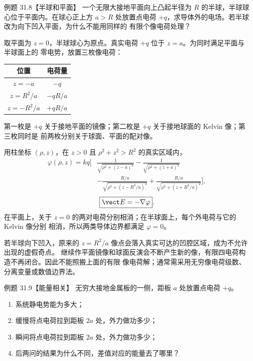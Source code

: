 \Needspace{0.42\textheight}
\begin{origexamplebox}{例题 31.8【半球和平面】}
一个无限大接地平面向上凸起半径为 $R$ 的半球，半球球心位于平面内。在球心正上方
$a>R$ 处放置点电荷 $+q$，求导体外的电场。若半球改为向下凹入平面，为什么不能用同样的
有限个像电荷处理？
\end{origexamplebox}

\begin{xesolution}
取平面为 $z=0$，半球球心为原点。真实电荷 $+q$ 位于 $z=a$。为同时满足平面与半球面上的
零电势，放置三枚像电荷：
\begin{center}
\begin{tabular}{c c}
\toprule
位置 & 电荷量\\
\midrule
$z=-a$ & $-q$\\
$z=R^2/a$ & $-qR/a$\\
$z=-R^2/a$ & $+qR/a$\\
\bottomrule
\end{tabular}
\end{center}
第一枚是 $+q$ 关于接地平面的镜像；第二枚是 $+q$ 关于接地球面的 Kelvin 像；第三枚同时是
前两枚分别关于球面、平面的配对像。

用柱坐标 $(\rho,z)$，在 $z>0$ 且 $\rho^2+z^2>R^2$ 的真实区域内，
\begin{align*}
  \varphi(\rho,z)=kq\bigg[&
  \frac1{\sqrt{\rho^2+(z-a)^2}}
  -\frac1{\sqrt{\rho^2+(z+a)^2}}\\
  &-\frac{R/a}{\sqrt{\rho^2+(z-R^2/a)^2}}
  +\frac{R/a}{\sqrt{\rho^2+(z+R^2/a)^2}}
  \bigg],
\end{align*}
\begin{equation}
  \boxed{\vect E=-\nabla\varphi}.
\end{equation}
在平面上，关于 $z=0$ 的两对电荷分别相消；在半球面上，每个外电荷与它的 Kelvin 像分别
相消，所以两类导体边界都满足 $\varphi=0$。

若半球向下凹入，原来的 $z=R^2/a$ 像点会落入真实可达的凹腔区域，成为不允许出现的虚假奇点。
继续作平面镜像和球面反演会不断产生新的像，有限四电荷构造不再闭合。因此不能照搬上面的有限
像电荷解；通常需采用无穷像电荷级数、分离变量或数值边界法。

\hemisphereImageDiagram
\end{xesolution}

\Needspace{0.4\textheight}
\begin{origexamplebox}{例题 31.9【能量相关】}
无穷大接地金属板的一侧，距板 $a$ 处放置点电荷 $+q$。
\begin{enumerate}[label=(\arabic*),leftmargin=2.2em]
  \item 系统静电势能为多大；
  \item 缓慢将点电荷拉到距板 $2a$ 处，外力做功多少；
  \item 瞬间将点电荷拉到距板 $2a$ 处，外力做功多少；
  \item 后两问的结果为什么不同，差值对应的能量去了哪里？
\end{enumerate}
\end{origexamplebox}

